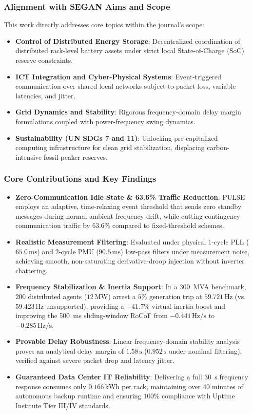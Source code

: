 \documentclass[11pt,a4paper]{article}
\begin{document}
\subsubsection*{Alignment with SEGAN Aims and Scope}
This work directly addresses core topics within the journal's scope:
\begin{itemize}
    \item \textbf{Control of Distributed Energy Storage}: Decentralized coordination of distributed rack-level battery assets under strict local State-of-Charge (SoC) reserve constraints.
    \item \textbf{ICT Integration and Cyber-Physical Systems}: Event-triggered communication over shared local networks subject to packet loss, variable latencies, and jitter.
    \item \textbf{Grid Dynamics and Stability}: Rigorous frequency-domain delay margin formulations coupled with power-frequency swing dynamics.
    \item \textbf{Sustainability (UN SDGs 7 and 11)}: Unlocking pre-capitalized computing infrastructure for clean grid stabilization, displacing carbon-intensive fossil peaker reserves.
\end{itemize}

\subsubsection*{Core Contributions and Key Findings}
\begin{itemize}
    \item \textbf{Zero-Communication Idle State \& 63.6\% Traffic Reduction}: PULSE employs an adaptive, time-relaxing event threshold that sends zero standby messages during normal ambient frequency drift, while cutting contingency communication traffic by $63.6\%$ compared to fixed-threshold schemes.
    \item \textbf{Realistic Measurement Filtering}: Evaluated under physical 1-cycle PLL ($65.0\,\mathrm{ms}$) and 2-cycle PMU ($90.5\,\mathrm{ms}$) low-pass filters under measurement noise, achieving smooth, non-saturating derivative-droop injection without inverter chattering.
    \item \textbf{Frequency Stabilization \& Inertia Support}: In a 300~MVA benchmark, 200 distributed agents ($12\,\mathrm{MW}$) arrest a $5\%$ generation trip at $59.721\,\mathrm{Hz}$ (vs. $59.423\,\mathrm{Hz}$ unsupported), providing a $+41.7\%$ virtual inertia boost and improving the 500~ms sliding-window RoCoF from $-0.441\,\mathrm{Hz/s}$ to $-0.285\,\mathrm{Hz/s}$.
    \item \textbf{Provable Delay Robustness}: Linear frequency-domain stability analysis proves an analytical delay margin of $1.58\,\mathrm{s}$ ($0.952\,\mathrm{s}$ under nominal filtering), verified against severe packet drop and latency jitter.
    \item \textbf{Guaranteed Data Center IT Reliability}: Delivering a full 30~s frequency response consumes only $0.166\,\mathrm{kWh}$ per rack, maintaining over 40 minutes of autonomous backup runtime and ensuring $100\%$ compliance with Uptime Institute Tier III/IV standards.
\end{itemize}
\end{document}
